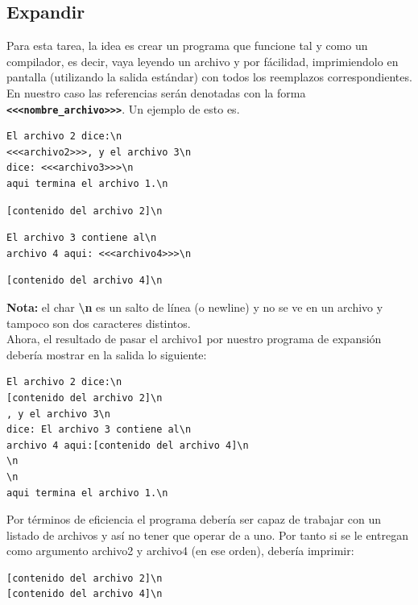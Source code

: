 \documentclass[dcc]{fcfmcourse}
\begin{document}
\subsection{Expandir}
Para esta tarea, la idea es crear un programa que funcione tal y como un compilador, es decir, vaya leyendo un archivo y por fácilidad, imprimiendolo en pantalla (utilizando la salida estándar) con todos los reemplazos correspondientes. En nuestro caso las referencias serán denotadas con la forma \textbf{\texttt{<<<nombre\_archivo>>>}}. Un ejemplo de esto es.

\begin{lstlisting}[frame=single, caption={archivo1}]
El archivo 2 dice:\n
<<<archivo2>>>, y el archivo 3\n
dice: <<<archivo3>>>\n
aqui termina el archivo 1.\n
\end{lstlisting}

\begin{lstlisting}[frame=single, caption={archivo2}]
[contenido del archivo 2]\n
\end{lstlisting}

\begin{lstlisting}[frame=single, caption={archivo3}]
El archivo 3 contiene al\n
archivo 4 aqui: <<<archivo4>>>\n
\end{lstlisting}

\begin{lstlisting}[frame=single, caption={archivo4}]
[contenido del archivo 4]\n
\end{lstlisting}


\textbf{Nota:} el char \textbf{\textbackslash n} es un salto de línea (o newline) y no se ve en un archivo y tampoco son dos caracteres distintos. \\

Ahora, el resultado de pasar el archivo1 por nuestro programa de expansión debería mostrar en la salida lo siguiente:

\begin{lstlisting}[frame=single]
El archivo 2 dice:\n 
[contenido del archivo 2]\n 
, y el archivo 3\n
dice: El archivo 3 contiene al\n
archivo 4 aqui:[contenido del archivo 4]\n
\n
\n
aqui termina el archivo 1.\n
\end{lstlisting}

Por términos de eficiencia el programa debería ser capaz de trabajar con un listado de archivos y así no tener que operar de a uno. Por tanto si se le entregan como argumento archivo2 y archivo4 (en ese orden), debería imprimir:

\begin{lstlisting}[frame=single]
[contenido del archivo 2]\n 
[contenido del archivo 4]\n 
\end{lstlisting}
\end{document}
